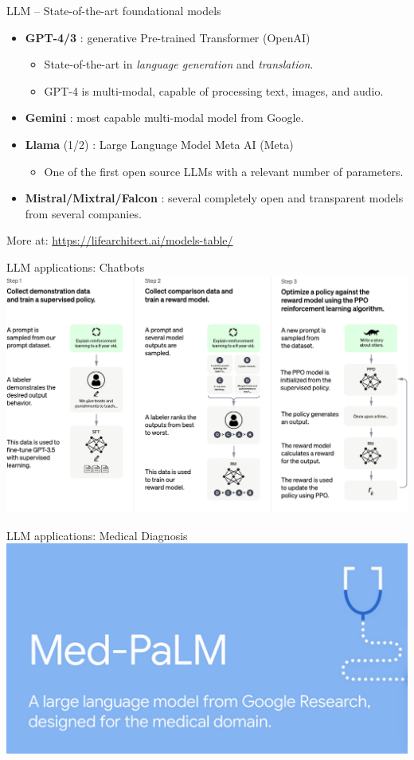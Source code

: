 \documentclass[presentation, 10pt]{beamer}\mode<presentation>{\usetheme{AMSBolognaFC}}
\begin{document}
\begin{frame}{LLM -- State-of-the-art foundational models}
	\begin{itemize}
		\item \textbf{GPT-4/3} \faLock: generative Pre-trained Transformer (OpenAI)
		\begin{itemize}
			\item State-of-the-art in \emph{language generation} and \emph{translation}.
			\item GPT-4 is multi-modal, capable of processing text, images, and audio.
		\end{itemize}
		\item \textbf{Gemini} \faLock: most capable multi-modal model from Google.
		\item \textbf{Llama} (1/2) \faUnlock: Large Language Model Meta AI (Meta) 
		\begin{itemize}
			\item One of the first open source LLMs with a relevant number of parameters.
		\end{itemize}
		\item \textbf{Mistral/Mixtral/Falcon} \faUnlock: several completely open and transparent models from several companies. 
	\end{itemize}
\centering
More at: \url{https://lifearchitect.ai/models-table/}
\end{frame}
\begin{frame}{LLM applications: Chatbots}
\includegraphics[width=\textwidth]{img/image.pdf}
\end{frame}
\begin{frame}{LLM applications: Medical Diagnosis}
\includegraphics[width=\textwidth]{img/palm-med.png}
\end{frame}
\end{document}
